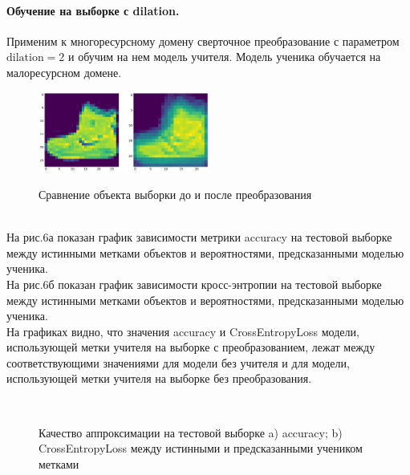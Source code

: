 \paragraph{Обучение на выборке с dilation.}
Применим к многоресурсному домену сверточное преобразование с параметром $\text{dilation}=2$ и обучим на нем модель учителя. Модель ученика обучается на малоресурсном домене.\\
\begin{figure}[h!t]\center
{\includegraphics[width=0.5\textwidth]{results/dilation}}
\caption{Сравнение объекта выборки до и после преобразования}
\end{figure}\\
На рис.6а показан график зависимости метрики accuracy на тестовой выборке между истинными метками объектов и вероятностями, предсказанными моделью ученика.\\
На рис.6б показан график зависимости кросс-энтропии на тестовой выборке между истинными метками объектов и вероятностями, предсказанными моделью ученика.\\
На графиках видно, что значения accuracy и CrossEntropyLoss модели, использующей метки учителя на выборке с преобразованием, лежат между соответствующими значениями для модели без учителя и для модели, использующей метки учителя на выборке без преобразования.
\begin{figure}[h!t]\center
{}
\\
\caption{Качество аппроксимации на тестовой выборке a) accuracy; b) CrossEntropyLoss между истинными и предсказанными учеником метками}
\end{figure}


